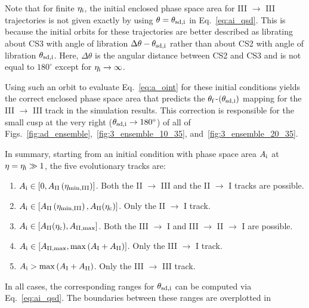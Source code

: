 \documentclass[
        fleqn,
        usenatbib,
    ]{mnras}
\newcommand*{\p}[1]{\left(#1\right)}
\newcommand*{\s}[1]{\left[#1\right]}
\begin{document}
\begin{enumerate}
        Note that for finite $\eta_{\rm i}$, the initial enclosed phase space
        area for III $\to$ III trajectories is not given exactly by using
        $\theta = \theta_{\rm sd, i}$ in Eq.~\eqref{eq:ai_qsd}. This is because
        the initial orbits for these trajectories are better described as
        librating about CS3 with angle of libration $\Delta \theta - \theta_{\rm
        sd, i}$ rather than about CS2 with angle of libration $\theta_{\rm sd,
        i}$. Here, $\Delta \theta$ is the angular distance between CS2 and CS3
        and is not equal to $180^\circ$ except for $\eta_{\rm i} \to \infty$.

        Using such an orbit to evaluate Eq.~\eqref{eq:a_oint} for these initial
        conditions yields the correct enclosed phase space area that predicts
        the $\theta_{\rm f}$-$\p{\theta_{\rm sd, i}}$ mapping for the III $\to$
        III track in the simulation results. This correction is responsible for
        the small cusp at the very right ($\theta_{\rm sd, i} \to 180^\circ$) of
        all of Figs.~\ref{fig:ad_ensemble},~\ref{fig:3_ensemble_10_35},
        and~\ref{fig:3_ensemble_20_35}.
\end{enumerate}
In summary, starting from an initial condition with phase space area $A_{\rm i}$
at $\eta = \eta_{\rm i} \gg 1$, the five evolutionary tracks are:
\begin{enumerate}
    \item $A_{\rm i} \in \s{0, A_{\rm II}\p{\eta_{\rm \min, III}}}$. Both the II
        $\to$ III and the II $\to$ I tracks are possible.

    \item $A_{\rm i} \in \s{A_{\rm II}\p{\eta_{\rm \min, III}}, A_{\rm
        II}(\eta_{\rm c})}$. Only the II $\to$ I track.

    \item $A_{\rm i} \in \s{A_{\rm II}(\eta_{\rm c}), A_{\rm II, \max}}$.
        Both the III $\to$ I and III $\to$ II $\to$ I are possible.

    \item $A_{\rm i} \in \s{A_{\rm II, \max}, \max \p{A_{\rm I} + A_{\rm II}}}$.
        Only the III $\to$ I track.

    \item $A_{\rm i} > \max \p{A_{\rm I} + A_{\rm II}}$. Only the III $\to$ III
        track.
\end{enumerate}
In all cases, the corresponding ranges for $\theta_{\rm sd,i}$ can be computed via
Eq.~\eqref{eq:ai_qsd}. The boundaries between these ranges are overplotted in
\end{document}
